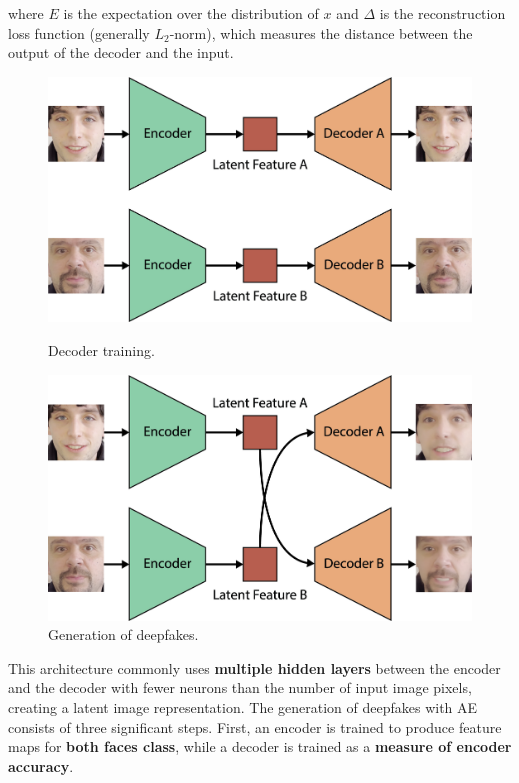 \documentclass[preprint]{elsarticle}
\begin{document}
where $E$ is the expectation over the distribution of $x$ and $\Delta$ is the reconstruction loss function (generally $L_2$-norm), which measures the distance between the output of the decoder and the input.



\begin{figure}[t]
	\centering
    \includegraphics[scale=0.6, keepaspectratio]{img/background_img/Training-AE.png}
    \caption{Decoder training.}\label{fig:training-ae}
	\includegraphics[scale=0.6, keepaspectratio]{img/background_img/Generation-AE2.png}
	\caption{Generation of deepfakes.}\label{fig:generation-ae}
\end{figure}


This architecture commonly uses \textbf{multiple hidden layers} between the encoder and the decoder 
with fewer neurons than the number of input image pixels, creating a latent image representation. 
The generation of deepfakes with AE consists of three significant steps.
First, an encoder is trained to produce feature maps for \textbf{both faces class}, while a decoder is trained as a \textbf{measure of encoder accuracy}. 
\end{document}
